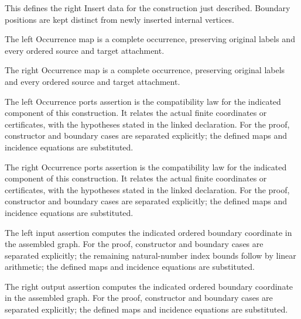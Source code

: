 This defines the right Insert data for the construction just described. Boundary positions are kept distinct from newly inserted internal vertices.
\par{}

The left Occurrence map is a complete occurrence, preserving original labels and every ordered source and target attachment.
\par{}

The right Occurrence map is a complete occurrence, preserving original labels and every ordered source and target attachment.
\par{}

The left Occurrence ports assertion is the compatibility law for the indicated component of this construction. It relates the actual finite coordinates or certificates, with the hypotheses stated in the linked declaration.
For the proof, constructor and boundary cases are separated explicitly; the defined maps and incidence equations are substituted.
\par{}

The right Occurrence ports assertion is the compatibility law for the indicated component of this construction. It relates the actual finite coordinates or certificates, with the hypotheses stated in the linked declaration.
For the proof, constructor and boundary cases are separated explicitly; the defined maps and incidence equations are substituted.
\par{}

The left input assertion computes the indicated ordered boundary coordinate in the assembled graph.
For the proof, constructor and boundary cases are separated explicitly; the remaining natural-number index bounds follow by linear arithmetic; the defined maps and incidence equations are substituted.
\par{}

The right output assertion computes the indicated ordered boundary coordinate in the assembled graph.
For the proof, constructor and boundary cases are separated explicitly; the defined maps and incidence equations are substituted.
\par{}

